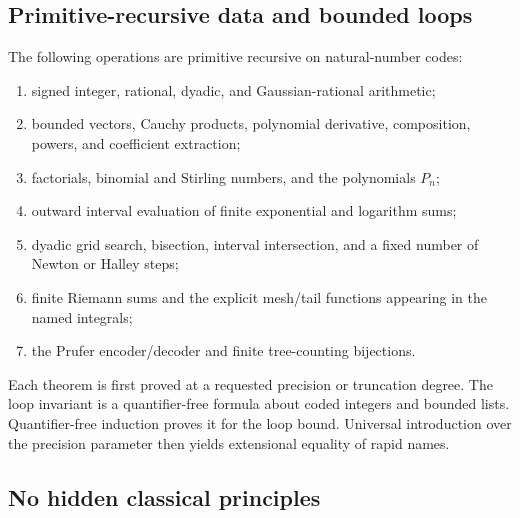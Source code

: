 \documentclass[11pt]{article}
\theoremstyle{definition}
\begin{document}
\subsection{Primitive-recursive data and bounded loops}

The following operations are primitive recursive on natural-number codes:
\begin{enumerate}
\item signed integer, rational, dyadic, and Gaussian-rational arithmetic;
\item bounded vectors, Cauchy products, polynomial derivative, composition,
powers, and coefficient extraction;
\item factorials, binomial and Stirling numbers, and the polynomials \(P_n\);
\item outward interval evaluation of finite exponential and logarithm sums;
\item dyadic grid search, bisection, interval intersection, and a fixed number
of Newton or Halley steps;
\item finite Riemann sums and the explicit mesh/tail functions appearing in the
named integrals;
\item the Prufer encoder/decoder and finite tree-counting bijections.
\end{enumerate}

Each theorem is first proved at a requested precision or truncation degree.
The loop invariant is a quantifier-free formula about coded integers and
bounded lists.  Quantifier-free induction proves it for the loop bound.
Universal introduction over the precision parameter then yields extensional
equality of rapid names.

\subsection{No hidden classical principles}
\end{document}
